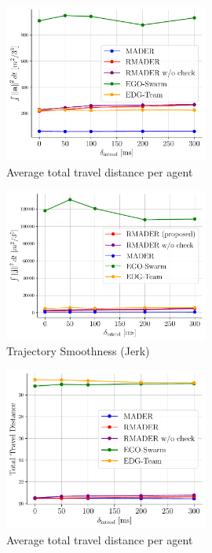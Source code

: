 \begin{figure}
    \centering
    \includegraphics[width=0.6\textwidth]{figures/traj_smoothness_acc.pdf}
    \caption{\centering Average total travel distance per agent}
    \label{fig:traj_smoothness_acc}
\end{figure}

\begin{figure}
    \centering
    \includegraphics[width=0.6\textwidth]{figures/traj_smoothness_jer.pdf}
    \caption{\centering Trajectory Smoothness (Jerk)}
    \label{fig:traj_smoothness_jerk}
\end{figure}

\begin{figure}
    \centering
    \includegraphics[width=0.6\textwidth]{figures/total_dist.pdf}
    \caption{\centering Average total travel distance per agent}
    \label{fig:total_dist}
\end{figure}

